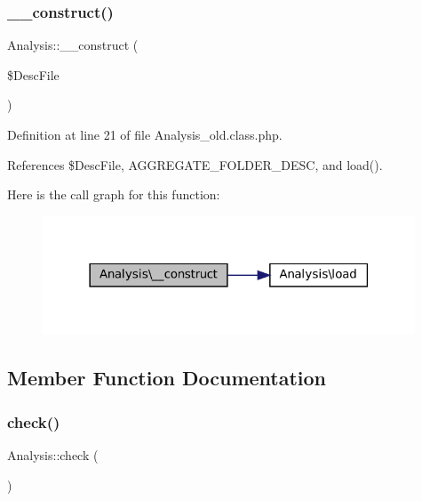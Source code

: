 \subsubsection{\texorpdfstring{\+\_\+\+\_\+construct()}{\_\_construct()}\hspace{0.1cm}{\footnotesize\ttfamily [2/2]}}
{\footnotesize\ttfamily Analysis\+::\+\_\+\+\_\+construct (\begin{DoxyParamCaption}\item[{}]{\$\+Desc\+File }\end{DoxyParamCaption})}



Definition at line 21 of file Analysis\+\_\+old.\+class.\+php.



References \$\+Desc\+File, A\+G\+G\+R\+E\+G\+A\+T\+E\+\_\+\+F\+O\+L\+D\+E\+R\+\_\+\+D\+E\+SC, and load().

Here is the call graph for this function\+:\nopagebreak
\begin{figure}[H]
\begin{center}
\leavevmode
\includegraphics[width=314pt]{class_analysis_aec383f4c92d9c98bcbe496194bb416f0_cgraph}
\end{center}
\end{figure}


\subsection{Member Function Documentation}
\mbox{\label{class_analysis_a25f3a02a783d2e29d3fd4d8c4a03cc4d}} 
\subsubsection{\texorpdfstring{check()}{check()}\hspace{0.1cm}{\footnotesize\ttfamily [1/2]}}
{\footnotesize\ttfamily Analysis\+::check (\begin{DoxyParamCaption}{ }\end{DoxyParamCaption})\hspace{0.3cm}{\ttfamily [protected]}}




